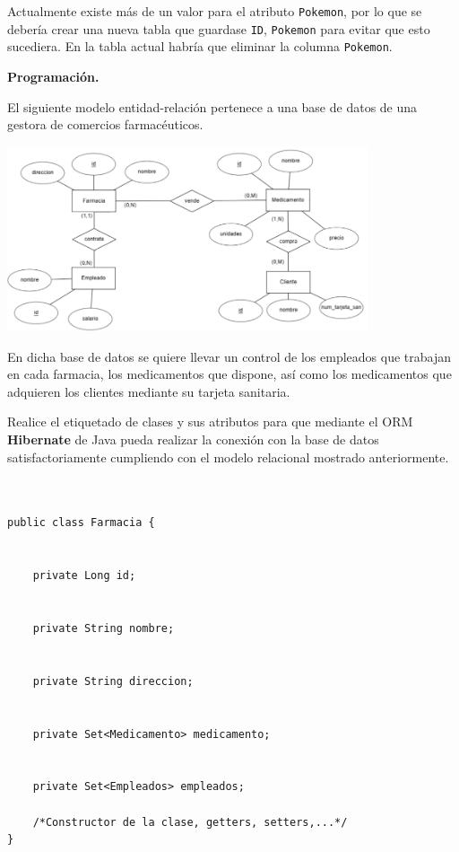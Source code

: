 \documentclass[12pt,a4paper,addpoints,answers]{exam}
\begin{document}
\begin{questions}
\begin{solution}
Actualmente existe más de un valor para el atributo \texttt{Pokemon}, por lo que se debería crear una nueva tabla que guardase \texttt{ID}, \texttt{Pokemon} para evitar que esto sucediera. En la tabla actual habría que eliminar la columna \texttt{Pokemon}.
\end{solution}

\newpage
\question[1] \textbf{Programación.}

El siguiente modelo entidad-relación pertenece a una base de datos de una gestora de comercios farmacéuticos.

\begin{center}
\includegraphics[width=0.8\textwidth]{figs/bbdd-2023-2024-ordinaria/mer-programacion.png}
\end{center}

En dicha base de datos se quiere llevar un control de los empleados que trabajan en cada farmacia, los medicamentos que dispone, así como los medicamentos que adquieren los clientes mediante su tarjeta sanitaria.

Realice el etiquetado de clases y sus atributos para que mediante el ORM \textbf{Hibernate} de Java pueda realizar la conexión con la base de datos satisfactoriamente cumpliendo con el modelo relacional mostrado anteriormente.
  
\begin{verbatim}

            
public class Farmacia {
    

    private Long id;


    private String nombre;

    
    private String direccion;


    private Set<Medicamento> medicamento;


    private Set<Empleados> empleados;

    /*Constructor de la clase, getters, setters,...*/
}



\end{verbatim}
\end{questions}
\end{document}
